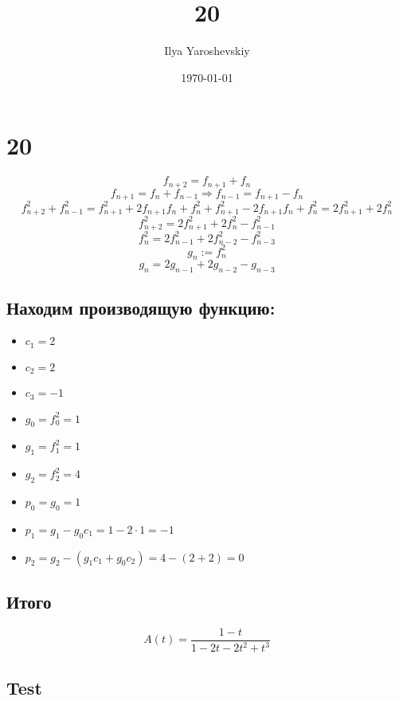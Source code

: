 \documentclass[english]{article}
\author{Ilya Yaroshevskiy}
\date{\today}
\title{20}
\theoremstyle{plain}
\theoremstyle{remark}
\theoremstyle{definition}
\begin{document}
\maketitle
\tableofcontents


\section*{20}
\label{sec:org2487b40}
\[ f_{n + 2} = f_{n + 1} + f_n \]
\[ f_{n + 1} = f_{n} + f_{n - 1} \Rightarrow f_{n - 1} = f_{n + 1} - f_n \]
\[ f_{n + 2}^2 + f_{n - 1}^2 = f_{n+1}^2 + 2f_{n + 1}f_n + f_n^2 + f_{n +1}^2 - 2f_{n + 1}f_n + f_n^2 = 2f_{n + 1}^2 + 2f_n^2 \]
\[ f_{n+2}^2 = 2f_{n + 1}^2 + 2f_n^2 - f_{n - 1}^2 \]
\[ f_{n}^2 = 2f_{n - 1}^2 + 2f_{n - 2}^2 - f_{n - 3}^2 \]
\[ g_n := f_n^2 \]
\[ g_n = 2g_{n - 1} + 2g_{n - 2} - g_{n - 3}\]
\subsection*{Находим производящую функцию:}
\label{sec:org8abee87}
\begin{itemize}
\item \(c_1 = 2\)
\item \(c_2 = 2\)
\item \(c_3 = -1\)
\end{itemize}


\begin{itemize}
\item \(g_0 = f_0^2 = 1\)
\item \(g_1 = f_1^2 = 1\)
\item \(g_2 = f_2^2 = 4\)
\end{itemize}


\begin{itemize}
\item \(p_0 = g_0 = 1\)
\item \(p_1 = g_1 - g_0c_1 = 1 - 2\cdot 1 = -1\)
\item \(p_2 = g_2 - (g_1c_1 + g_0c_2) = 4 - (2 + 2) = 0\)
\end{itemize}

\subsection*{Итого}
\label{sec:orgd5a0636}
\[ A(t) = \frac{1 - t}{1 - 2t - 2t^2 + t^3} \]

\subsection*{Test}
\label{sec:orgfdc10d8}
\begin{latex}
\begin{center}
\end{center}
\end{latex}
\end{document}

